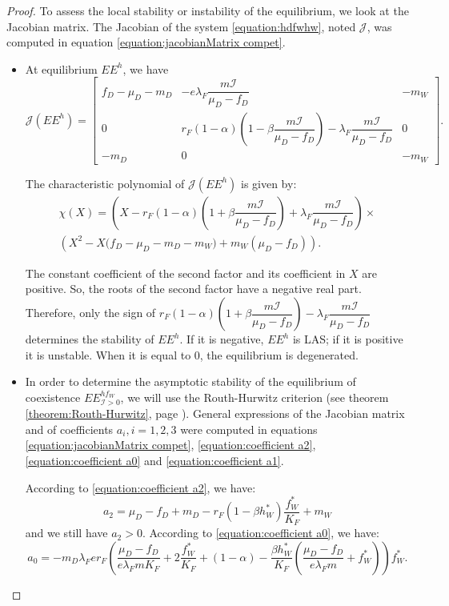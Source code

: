 \documentclass{article}
\newcommand{\lfw}{\lambda_{F}}
\newcommand{\lfw}{\lambda_{F}}
\newcommand{\cI}{\mathcal{I}}
\theoremstyle{definition}
\theoremstyle{remark}
\begin{document}
\begin{proof}
To assess the local stability or instability of the equilibrium, we look at the Jacobian matrix. The Jacobian of the system \eqref{equation:hdfwhw}, noted $\mathcal{J}$, was computed in equation \eqref{equation:jacobianMatrix compet}.

\begin{itemize}
\item At equilibrium $EE^{h}$, we have
\begin{equation*}
\mathcal{J}(EE^{h}) = \begin{bmatrix}
f_D-\mu_D - m_D & -e \lfw \dfrac{m \cI}{\mu_D - f_D} & -m_W \\
0 & r_F(1-\alpha)\left(1-\beta\dfrac{m\cI}{\mu_D - f_D}\right) - \lfw\dfrac{m\cI}{\mu_D - f_D} & 0 \\
-m_D & 0 & -m_W
\end{bmatrix}.
\end{equation*}


The characteristic polynomial of $\mathcal{J}(EE^{h})$ is given by:
\begin{multline*}
\chi(X) = \left(X - r_F(1-\alpha)\left(1+\beta\dfrac{m\cI}{\mu_D - f_D}\right) + \lfw\dfrac{m\cI}{\mu_D - f_D} \right) \times \\ \left(X^2 - X\Big(f_D - \mu_D - m_D - m_W \Big) + m_W(\mu_D - f_D)\right).
\end{multline*}

The constant coefficient of the second factor and its coefficient in $X$ are positive. So, the roots of the second factor have a negative real part. Therefore, only the sign of $r_F(1-\alpha)\left(1+\beta\dfrac{m\cI}{\mu_D - f_D}\right) - \lfw\dfrac{m\cI}{\mu_D - f_D}$ determines the stability of $EE^{h}$. If it is negative, $EE^{h}$ is LAS; if it is positive it is unstable. When it is equal to 0, the equilibrium is degenerated.

\item In order to determine the asymptotic stability of the equilibrium of coexistence $EE^{hf_W}_{\cI > 0}$, we will use the Routh-Hurwitz criterion (see theorem \ref{theorem:Routh-Hurwitz}, page \pageref{theorem:Routh-Hurwitz}). General expressions of the Jacobian matrix and of coefficients $a_i, i = 1,2,3$ were computed in equations \eqref{equation:jacobianMatrix compet}, \eqref{equation:coefficient a2}, \eqref{equation:coefficient a0} and \eqref{equation:coefficient a1}. 

According to \eqref{equation:coefficient a2}, we have:
\begin{equation*}
a_2 =  \mu_D - f_D + m_D - r_F (1 - \beta h_W^*) \dfrac{f_W^*}{K_F} + m_W
\end{equation*}
and we still have $a_2>0$. According to \eqref{equation:coefficient a0}, we have:
\begin{equation*}
a_0 = -m_D \lfw e r_F \left(\dfrac{\mu_D -f_D }{e \lfw m K_F} + 2\dfrac{f_W^*}{K_F} + (1-\alpha) - \dfrac{\beta h_W^*}{K_F} \left(\dfrac{\mu_D -f_D }{e \lfw m} + f_W^*\right) \right) f_W^*.
\end{equation*}


\end{itemize}
\end{proof}
\end{document}
